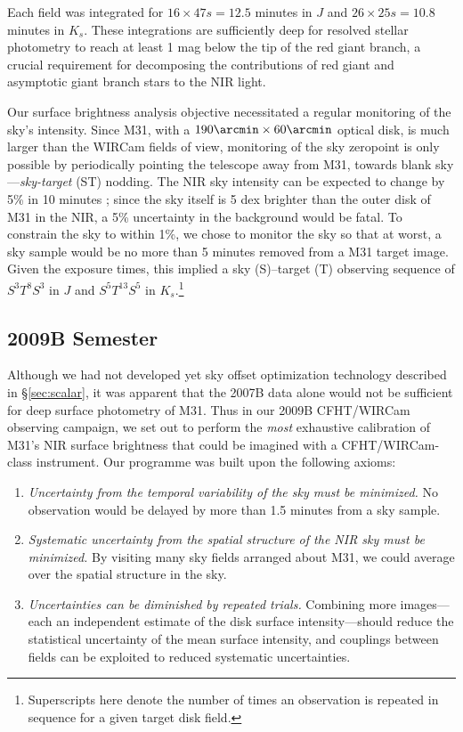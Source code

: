 \documentclass[iop]{emulateapj}
\begin{document}
Each field was integrated for $16\times 47 s = 12.5$ minutes in $J$ and $26\times 25 s = 10.8$ minutes in $K_s$. These integrations are sufficiently deep for resolved stellar photometry to reach at least 1 mag below the tip of the red giant branch, a crucial requirement for decomposing the contributions of red giant and asymptotic giant branch stars to the NIR light.

Our surface brightness analysis objective necessitated a regular monitoring of the sky's intensity. Since M31, with a $190\arcmin \times 60\arcmin$ optical disk, is much larger than the WIRCam fields of view, monitoring of the sky zeropoint is only possible by periodically pointing the telescope away from M31, towards blank sky---\emph{sky-target} (ST) nodding. The NIR sky intensity can be expected to change by 5\% in 10 minutes \citep{Adams:1996,Vaduvescu:2004}; since the sky itself is 5 dex brighter than the outer disk of M31 in the NIR, a 5\% uncertainty in the background would be fatal. To constrain the sky to within 1\%, we chose to monitor the sky so that at worst, a sky sample would be no more than 5 minutes removed from a M31 target image. Given the exposure times, this implied a sky (S)--target (T) observing sequence of $S^3T^8S^3$ in $J$ and $S^5T^{13}S^5$ in $K_s$.\footnote{Superscripts here denote the number of times an observation is repeated in sequence for a given target disk field.}


\subsection{2009B Semester} %
\label{sub:obs9}

Although we had not developed yet sky offset optimization technology described in \S \ref{sec:scalar}, it was apparent that the 2007B data alone would not be sufficient for deep surface photometry of M31. Thus in our 2009B CFHT/WIRCam observing campaign, we set out to perform the \emph{most} exhaustive calibration of M31's NIR surface brightness that could be imagined with a CFHT/WIRCam-class instrument. Our programme was built upon the following axioms:

\begin{enumerate}
    \item \emph{Uncertainty from the temporal variability of the sky must be minimized.} No observation would be delayed by more than 1.5 minutes from a sky sample.
    \item \emph{Systematic uncertainty from the spatial structure of the NIR sky must be minimized.} By visiting many sky fields arranged about M31, we could average over the spatial structure in the sky.
    \item \emph{Uncertainties can be diminished by repeated trials.} Combining more images---each an independent estimate of the disk surface intensity---should reduce the statistical uncertainty of the mean surface intensity, and couplings between fields can be exploited to reduced systematic uncertainties.
\end{enumerate}
\end{document}
